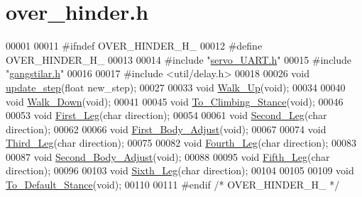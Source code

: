 \hypertarget{over__hinder_8h_source}{}\section{over\+\_\+hinder.\+h}
\label{over__hinder_8h_source}

\begin{DoxyCode}
00001 
00011 \textcolor{preprocessor}{#ifndef OVER\_HINDER\_H\_}
00012 \textcolor{preprocessor}{#define OVER\_HINDER\_H\_}
00013 
00014 \textcolor{preprocessor}{#include "\hyperlink{servo___u_a_r_t_8h}{servo\_UART.h}"}
00015 \textcolor{preprocessor}{#include "\hyperlink{gangstilar_8h}{gangstilar.h}"}
00016 
00017 \textcolor{preprocessor}{#include <util/delay.h>}
00018 
00026 \textcolor{keywordtype}{void} \hyperlink{over__hinder_8h_a28758391250bb7a02f30ec22195c9922}{update\_step}(\textcolor{keywordtype}{float} new\_step); 
00027 
00033 \textcolor{keywordtype}{void} \hyperlink{over__hinder_8h_ac5e595f6e488678c5e18cb3fd9364fb3}{Walk\_Up}(\textcolor{keywordtype}{void}); 
00034 
00040 \textcolor{keywordtype}{void} \hyperlink{over__hinder_8h_aad65c7e9222750ff718f2a9ccaa2a11c}{Walk\_Down}(\textcolor{keywordtype}{void}); 
00041 
00045 \textcolor{keywordtype}{void} \hyperlink{over__hinder_8h_a721328d45f539a2d4caecc7d5726fc88}{To\_Climbing\_Stance}(\textcolor{keywordtype}{void});
00046 
00053 \textcolor{keywordtype}{void} \hyperlink{over__hinder_8h_a8e93e827f047dac258e8334869fb2615}{First\_Leg}(\textcolor{keywordtype}{char} direction);
00054 
00061 \textcolor{keywordtype}{void} \hyperlink{over__hinder_8h_a656636b54d65528c5f66fbe1ae0c793c}{Second\_Leg}(\textcolor{keywordtype}{char} direction);
00062 
00066 \textcolor{keywordtype}{void} \hyperlink{over__hinder_8h_a1fecdcd5c5c27607d812f759f5ba1d97}{First\_Body\_Adjust}(\textcolor{keywordtype}{void});
00067 
00074 \textcolor{keywordtype}{void} \hyperlink{over__hinder_8h_ae5a0956265d1177bb332cba019226908}{Third\_Leg}(\textcolor{keywordtype}{char} direction);
00075 
00082 \textcolor{keywordtype}{void} \hyperlink{over__hinder_8h_aa7388d904fc9be082274a66dcb366d34}{Fourth\_Leg}(\textcolor{keywordtype}{char} direction);
00083 
00087 \textcolor{keywordtype}{void} \hyperlink{over__hinder_8h_a362c54ea3c8947bc527effc9eb21e69c}{Second\_Body\_Adjust}(\textcolor{keywordtype}{void});
00088 
00095 \textcolor{keywordtype}{void} \hyperlink{over__hinder_8h_ad5195902238f5ace14e522b1277f09ad}{Fifth\_Leg}(\textcolor{keywordtype}{char} direction);
00096 
00103 \textcolor{keywordtype}{void} \hyperlink{over__hinder_8h_ae160f42d7debd07279bb1464bb3b39d1}{Sixth\_Leg}(\textcolor{keywordtype}{char} direction);
00104 
00105 
00109 \textcolor{keywordtype}{void} \hyperlink{over__hinder_8h_aa1749474a1fb3aa13b681498eb340fc7}{To\_Default\_Stance}(\textcolor{keywordtype}{void});
00110 
00111 \textcolor{preprocessor}{#endif }\textcolor{comment}{/* OVER\_HINDER\_H\_ */}\textcolor{preprocessor}{}
\end{DoxyCode}
